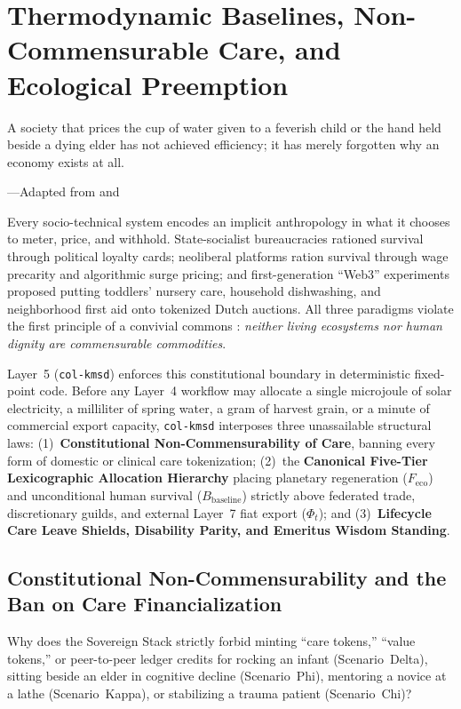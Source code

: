\chapter{Thermodynamic Baselines, Non-Commensurable Care, and Ecological Preemption}
\label{ch:l5-constitutional-floors}

\epigraph{A society that prices the cup of water given to a feverish child or the hand held beside a dying elder has not achieved efficiency; it has merely forgotten why an economy exists at all.}{---Adapted from \textcite{illich1973} and \textcite{raworth2017}}

Every socio-technical system encodes an implicit anthropology in what it chooses to meter, price,
and withhold. State-socialist bureaucracies rationed survival through political loyalty cards;
neoliberal platforms ration survival through wage precarity and algorithmic surge pricing; and
first-generation ``Web3'' experiments proposed putting toddlers' nursery care, household dishwashing,
and neighborhood first aid onto tokenized Dutch auctions. All three paradigms violate the first
principle of a convivial commons \parencite{kropotkin1902,illich1973,raworth2017}: \textit{neither
living ecosystems nor human dignity are commensurable commodities}.

Layer~5 (\texttt{col-kmsd}) enforces this constitutional boundary in deterministic fixed-point
code. Before any Layer~4 workflow may allocate a single microjoule of solar electricity, a
milliliter of spring water, a gram of harvest grain, or a minute of commercial export capacity,
\texttt{col-kmsd} interposes three unassailable structural laws: (1)~\textbf{Constitutional
Non-Commensurability of Care}, banning every form of domestic or clinical care tokenization;
(2)~the \textbf{Canonical Five-Tier Lexicographic Allocation Hierarchy} placing planetary
regeneration ($F_{\mathrm{eco}}$) and unconditional human survival ($B_{\mathrm{baseline}}$) strictly
above federated trade, discretionary guilds, and external Layer~7 fiat export ($\Phi_t$); and
(3)~\textbf{Lifecycle Care Leave Shields, Disability Parity, and Emeritus Wisdom Standing}.

\section{Constitutional Non-Commensurability and the Ban on Care Financialization}
\label{sec:ch6-non-commensurability}

Why does the Sovereign Stack strictly forbid minting ``care tokens,'' ``value tokens,'' or
peer-to-peer ledger credits for rocking an infant (Scenario~Delta), sitting beside an elder in
cognitive decline (Scenario~Phi), mentoring a novice at a lathe (Scenario~Kappa), or stabilizing a
trauma patient (Scenario~Chi)?

